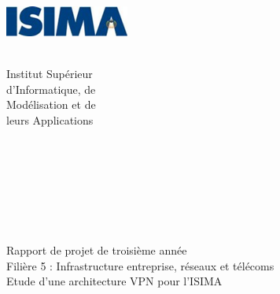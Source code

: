 \begin{titlepage}
	\begin{minipage}{0.5\textwidth}
		\begin{flushleft} \large
			\includegraphics[height=1cm]{images/logo-isima.png}\\
		\end{flushleft}
	\end{minipage}
	\begin{minipage}{0.43\textwidth}
		\begin{flushright} \large
		\end{flushright}
	\end{minipage}
	
	\begin{minipage}{0.5\textwidth}
		\begin{flushleft} \large
			~\\
			Institut Supérieur\\
			d'Informatique, de\\
			Modélisation et de\\
			leurs Applications
		\end{flushleft}
	\end{minipage}
	\begin{minipage}{0.415\textwidth}
		\begin{flushright} \large
			~\\
			~\\
			~\\
			~\\
			~
		\end{flushright}
	\end{minipage}

	\vfill
	\begin{center}
		\Hrule \\[0.4cm]
		\Large{Rapport de projet de troisième année}\\
		\Large Filière 5 : Infrastructure entreprise, réseaux et télécoms\\[1.2cm]
		\Huge{Etude d'une architecture VPN pour l'ISIMA}\\[0.4cm]
		\Hrule \\[0.4cm]
	\end{center}
	

\end{titlepage}
